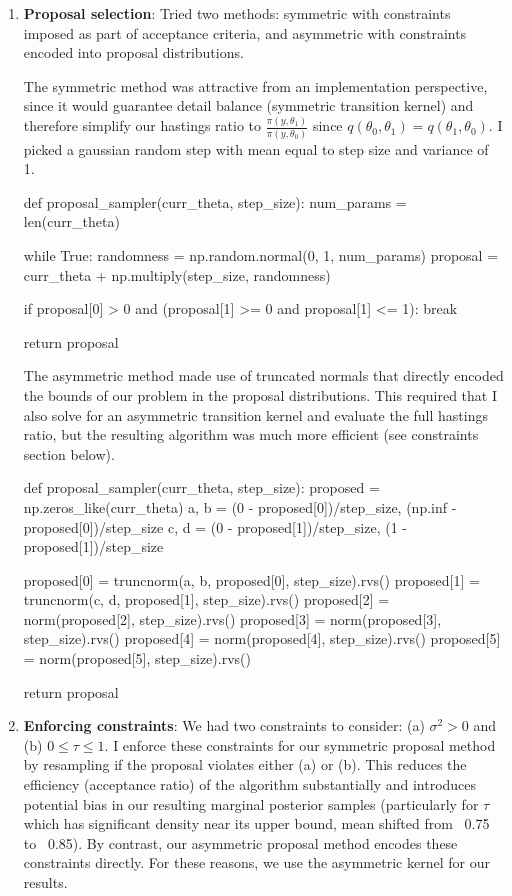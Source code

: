 \documentclass[12pt,letterpaper,twoside]{article}
\begin{document}
\begin{enumerate}[label=(\alph*)]
\item \textbf{Proposal selection}: Tried two methods: symmetric with constraints
imposed as part of acceptance criteria, and asymmetric with constraints encoded 
into proposal distributions.

The symmetric method was attractive from an implementation perspective, since 
it would guarantee detail balance (symmetric transition kernel) and therefore 
simplify our hastings ratio to $\frac{\pi(y, \theta_1)}{\pi(y,\theta_0)}$ since 
$q(\theta_0, \theta_1)=q(\theta_1, \theta_0)$. I picked a gaussian random step 
with mean equal to step size and variance of 1.

\begin{python}
def proposal_sampler(curr_theta, step_size):
    num_params = len(curr_theta)

    while True:
        randomness = np.random.normal(0, 1, num_params)
        proposal = curr_theta + np.multiply(step_size, randomness)

        if proposal[0] > 0 and (proposal[1] >= 0 and proposal[1] <= 1):
            break

    return proposal
\end{python}

The asymmetric method made use of truncated normals that directly encoded 
the bounds of our problem in the proposal distributions. This required that 
I also solve for an asymmetric transition kernel and evaluate the full 
hastings ratio, but the resulting algorithm was much more efficient (see 
constraints section below).
\begin{python}
def proposal_sampler(curr_theta, step_size):
    proposed = np.zeros_like(curr_theta)
    a, b = (0 - proposed[0])/step_size, (np.inf - proposed[0])/step_size
    c, d = (0 - proposed[1])/step_size, (1 - proposed[1])/step_size

    proposed[0] = truncnorm(a, b, proposed[0], step_size).rvs()
    proposed[1] = truncnorm(c, d, proposed[1], step_size).rvs()
    proposed[2] = norm(proposed[2], step_size).rvs()
    proposed[3] = norm(proposed[3], step_size).rvs()
    proposed[4] = norm(proposed[4], step_size).rvs()
    proposed[5] = norm(proposed[5], step_size).rvs()

    return proposal
\end{python}

\item \textbf{Enforcing constraints}: We had two constraints to consider: (a) $\sigma^2 > 0$ 
and (b) $0 \le \tau \le 1$. I enforce these constraints for our symmetric proposal method by resampling 
if the proposal violates either (a) or (b). This reduces the efficiency (acceptance ratio) of 
the algorithm substantially and introduces potential bias in our resulting marginal posterior 
samples (particularly for $\tau$ which has significant density near its upper bound, mean shifted 
from ~0.75 to ~0.85). By contrast, our asymmetric proposal method encodes these constraints directly. 
For these reasons, we use the asymmetric kernel for our results.


\end{enumerate}
\end{document}
